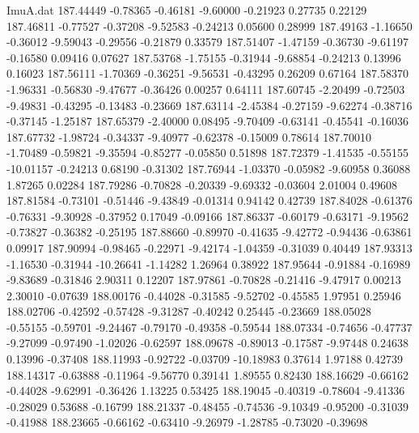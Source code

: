 \begin{filecontents}{ImuA.dat}
 187.44449   -0.78365   -0.46181   -9.60000   -0.21923    0.27735    0.22129
 187.46811   -0.77527   -0.37208   -9.52583   -0.24213    0.05600    0.28999
 187.49163   -1.16650   -0.36012   -9.59043   -0.29556   -0.21879    0.33579
 187.51407   -1.47159   -0.36730   -9.61197   -0.16580    0.09416    0.07627
 187.53768   -1.75155   -0.31944   -9.68854   -0.24213    0.13996    0.16023
 187.56111   -1.70369   -0.36251   -9.56531   -0.43295    0.26209    0.67164
 187.58370   -1.96331   -0.56830   -9.47677   -0.36426    0.00257    0.64111
 187.60745   -2.20499   -0.72503   -9.49831   -0.43295   -0.13483   -0.23669
 187.63114   -2.45384   -0.27159   -9.62274   -0.38716   -0.37145   -1.25187
 187.65379   -2.40000    0.08495   -9.70409   -0.63141   -0.45541   -0.16036
 187.67732   -1.98724   -0.34337   -9.40977   -0.62378   -0.15009    0.78614
 187.70010   -1.70489   -0.59821   -9.35594   -0.85277   -0.05850    0.51898
 187.72379   -1.41535   -0.55155  -10.01157   -0.24213    0.68190   -0.31302
 187.76944   -1.03370   -0.05982   -9.60958    0.36088    1.87265    0.02284
 187.79286   -0.70828   -0.20339   -9.69332   -0.03604    2.01004    0.49608
 187.81584   -0.73101   -0.51446   -9.43849   -0.01314    0.94142    0.42739
 187.84028   -0.61376   -0.76331   -9.30928   -0.37952    0.17049   -0.09166
 187.86337   -0.60179   -0.63171   -9.19562   -0.73827   -0.36382   -0.25195
 187.88660   -0.89970   -0.41635   -9.42772   -0.94436   -0.63861    0.09917
 187.90994   -0.98465   -0.22971   -9.42174   -1.04359   -0.31039    0.40449
 187.93313   -1.16530   -0.31944  -10.26641   -1.14282    1.26964    0.38922
 187.95644   -0.91884   -0.16989   -9.83689   -0.31846    2.90311    0.12207
 187.97861   -0.70828   -0.21416   -9.47917    0.00213    2.30010   -0.07639
 188.00176   -0.44028   -0.31585   -9.52702   -0.45585    1.97951    0.25946
 188.02706   -0.42592   -0.57428   -9.31287   -0.40242    0.25445   -0.23669
 188.05028   -0.55155   -0.59701   -9.24467   -0.79170   -0.49358   -0.59544
 188.07334   -0.74656   -0.47737   -9.27099   -0.97490   -1.02026   -0.62597
 188.09678   -0.89013   -0.17587   -9.97448    0.24638    0.13996   -0.37408
 188.11993   -0.92722   -0.03709  -10.18983    0.37614    1.97188    0.42739
 188.14317   -0.63888   -0.11964   -9.56770    0.39141    1.89555    0.82430
 188.16629   -0.66162   -0.44028   -9.62991   -0.36426    1.13225    0.53425
 188.19045   -0.40319   -0.78604   -9.41336   -0.28029    0.53688   -0.16799
 188.21337   -0.48455   -0.74536   -9.10349   -0.95200   -0.31039   -0.41988
 188.23665   -0.66162   -0.63410   -9.26979   -1.28785   -0.73020   -0.39698

\end{filecontents}

